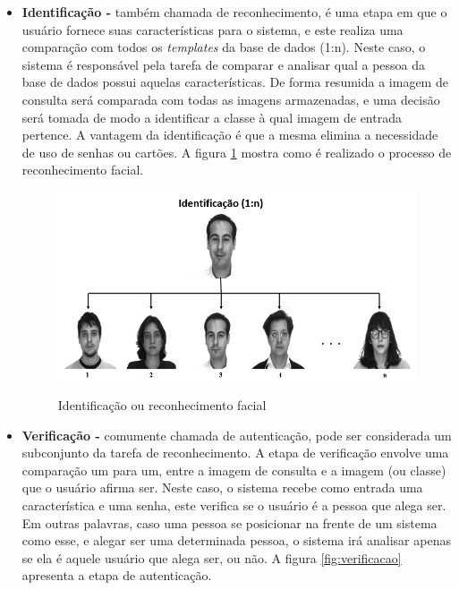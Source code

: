 \begin{itemize}
\item \textbf{Identificação -} também chamada de reconhecimento, é uma etapa em que o usuário fornece suas características para o sistema, e este realiza uma comparação com todos os \textit{templates} da base de dados (1:n). Neste caso, o sistema é responsável pela tarefa de comparar e analisar qual a pessoa da base de dados possui aquelas características. De forma resumida a imagem de consulta será comparada com todas as imagens armazenadas, e uma decisão será tomada de modo a identificar a classe à qual imagem de entrada pertence. A vantagem da identificação é que a mesma elimina a necessidade de uso de senhas ou cartões. A figura \ref{fig:identificacao} mostra como é realizado o processo de reconhecimento facial.
 
\begin{figure}[H]
\centering
\caption{Identificação ou reconhecimento facial}
\includegraphics[scale = 0.75]{imgs/1praN.png}
\label{fig:identificacao}
\end{figure}
 
\item \textbf{Verificação -} comumente chamada de autenticação, pode ser considerada um subconjunto da tarefa de reconhecimento. A etapa  de verificação envolve uma comparação um para um, entre a imagem de consulta e a imagem (ou classe) que o usuário afirma ser. Neste caso, o sistema recebe como entrada uma característica  e uma senha, este verifica se o usuário é a pessoa que alega ser. Em outras palavras, caso uma pessoa se posicionar na frente de um sistema como esse, e alegar ser uma determinada pessoa, o sistema irá analisar apenas se ela é aquele usuário que alega ser, ou não. A figura \ref{fig:verificacao} apresenta a etapa de autenticação.

\end{itemize}

